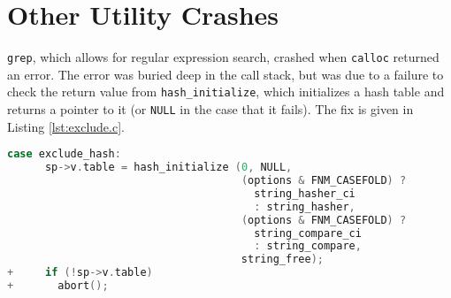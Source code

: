\section{Other Utility Crashes}
\label{appendix:other_gnu}

\texttt{grep}, which allows for regular expression search, crashed when \texttt{calloc} returned an error. The error was buried deep in the call stack, but was due to a failure to check the return value from \texttt{hash\_initialize}, which initializes a hash table and returns a pointer to it (or \texttt{NULL} in the case that it fails). The fix is given in Listing \ref{lst:exclude.c}.

\begin{lstlisting}[label={lst:exclude.c},firstnumber=265, caption={\texttt{lib/exclude.c}.}, language=C]
	case exclude_hash:
	  sp->v.table = hash_initialize (0, NULL,
	                                 (options & FNM_CASEFOLD) ?
	                                   string_hasher_ci
	                                   : string_hasher,
	                                 (options & FNM_CASEFOLD) ?
	                                   string_compare_ci
	                                   : string_compare,
	                                 string_free);
+	  if (!sp->v.table)
+	    abort();
                                          
\end{lstlisting}